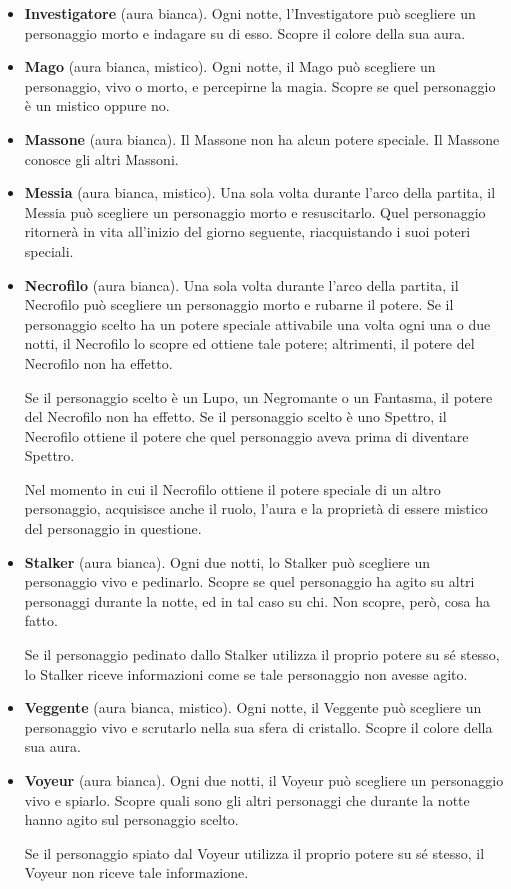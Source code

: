 \documentclass[a4paper,10pt]{article}
\begin{document}
\begin{itemize}
 \item {\bf Investigatore} (aura bianca). Ogni notte, l'Investigatore può
scegliere un personaggio morto e indagare su di esso. Scopre il colore della sua
aura.

 \item {\bf Mago} (aura bianca, mistico). Ogni notte, il Mago può scegliere un
personaggio, vivo o morto, e percepirne la magia. Scopre se quel personaggio è
un mistico oppure no.
 
 \item {\bf Massone} (aura bianca). Il Massone non ha alcun potere speciale. Il
Massone conosce gli altri Massoni.
 
 \item {\bf Messia} (aura bianca, mistico). Una sola volta durante l'arco della
partita, il Messia può scegliere un personaggio morto e resuscitarlo. Quel
personaggio ritornerà in vita all'inizio del giorno seguente, riacquistando i
suoi poteri speciali.

 \item {\bf Necrofilo} (aura bianca). Una sola volta durante l'arco della
partita, il Necrofilo può scegliere un personaggio morto e rubarne il potere. 
 Se il personaggio scelto ha un potere speciale attivabile una volta ogni una o
due notti, il Necrofilo lo scopre ed ottiene tale potere; altrimenti, il potere
del Necrofilo non ha effetto.
 
 Se il personaggio scelto è un Lupo, un Negromante o un Fantasma, il potere del
Necrofilo non ha effetto.
 Se il personaggio scelto è uno Spettro, il Necrofilo ottiene il potere che quel
personaggio aveva prima di diventare Spettro.
 
 Nel momento in cui il Necrofilo ottiene il potere speciale di un altro
personaggio, acquisisce anche il ruolo, l'aura e la proprietà di essere mistico
del personaggio in questione.

 \item {\bf Stalker} (aura bianca). Ogni due notti, lo Stalker può scegliere un
personaggio vivo e pedinarlo. Scopre se quel personaggio ha agito su altri
personaggi durante la notte, ed in tal caso su chi. Non scopre, però, cosa ha
fatto.
 
 Se il personaggio pedinato dallo Stalker utilizza il proprio potere su sé
stesso, lo Stalker riceve informazioni come se tale personaggio non avesse
agito.
 
 \item {\bf Veggente} (aura bianca, mistico). Ogni notte, il Veggente può
scegliere un personaggio vivo e scrutarlo nella sua sfera di cristallo. Scopre
il colore della sua aura.

 \item {\bf Voyeur} (aura bianca). Ogni due notti, il Voyeur può scegliere un
personaggio vivo e spiarlo. Scopre quali sono gli altri personaggi che
durante la notte hanno agito sul personaggio scelto.
 
 Se il personaggio spiato dal Voyeur utilizza il proprio potere su sé stesso, il
Voyeur non riceve tale informazione.

\end{itemize}
\end{document}
